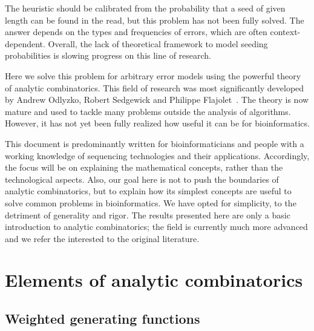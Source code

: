 \documentclass{article}
\begin{document}
The heuristic should be calibrated from the probability that a seed of
given length can be found in the read, but this problem has not been fully
solved. The answer depends on the types and frequencies of errors, which
are often context-dependent. Overall, the lack of theoretical framework to
model seeding probabilities is slowing progress on this line of research.

Here we solve this problem for arbitrary error models using the powerful
theory of analytic combinatorics. This field of research was most
significantly developed by Andrew Odlyzko, Robert Sedgewick and Philippe
Flajolet~\cite{flajolet1990singularity, flajolet1996introduction,
Flajolet:2009:AC:1506267}. The theory is now mature and used to tackle
many problems outside the analysis of algorithms. However, it has not yet
been fully realized how useful it can be for bioinformatics.

This document is predominantly written for bioinformaticians and people
with a working knowledge of sequencing technologies and their
applications. Accordingly, the focus will be on explaining the
mathematical concepts, rather than the technological aspects. Also, our
goal here is not to push the boundaries of analytic combinatorics, but to
explain how its simplest concepts are useful to solve common problems in
bioinformatics. We have opted for simplicity, to the detriment of
generality and rigor. The results presented here are only a basic
introduction to analytic combinatorics; the field is currently much more
advanced and we refer the interested to the original literature.

\section{Elements of analytic combinatorics}
\label{sec:anal}

\subsection{Weighted generating functions}
\label{subsec:WGF}
\end{document}
